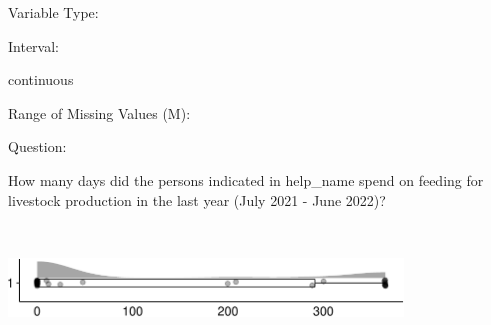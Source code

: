 \documentclass[
]{article}
\begin{document}
\begin{minipage}[t]{0.3\linewidth}

Variable Type:

\end{minipage}%
\begin{minipage}[t]{0.7\linewidth}

\end{minipage}

\begin{minipage}[t]{0.3\linewidth}

Interval:

\end{minipage}%
\begin{minipage}[t]{0.7\linewidth}

continuous

\end{minipage}

\begin{minipage}[t]{0.3\linewidth}

Range of Missing Values (M):

\end{minipage}%
\begin{minipage}[t]{0.7\linewidth}

\end{minipage}

\begin{minipage}[t]{0.3\linewidth}

Question:

\end{minipage}%
\begin{minipage}[t]{0.7\linewidth}

How many days did the persons indicated in help\_name spend on feeding
for livestock production in the last year (July 2021 - June 2022)?

\end{minipage}

\begin{minipage}[t]{0.3\linewidth}

~

\end{minipage}%
\begin{minipage}[t]{0.7\linewidth}

\includegraphics[width=396px]{codebook_template_files/figure-latex/q7_37_rainplot-1}

\end{minipage}
 \vspace*{-6mm} 
\end{document}
